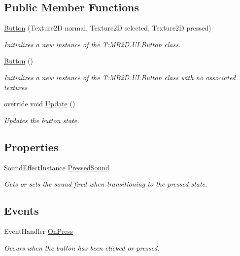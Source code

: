 \subsection*{Public Member Functions}
\begin{DoxyCompactItemize}
\item 
\hyperlink{class_m_b2_d_1_1_u_i_1_1_button_a30bf56105fa12c18ebffa1ba3e84cad9}{Button} (Texture2D normal, Texture2D selected, Texture2D pressed)
\begin{DoxyCompactList}\small\item\em Initializes a new instance of the T\+:\+M\+B2\+D.\+U\+I.\+Button class. \end{DoxyCompactList}\item 
\hyperlink{class_m_b2_d_1_1_u_i_1_1_button_a4d9a4339d2ebf59c059a493787790aa4}{Button} ()
\begin{DoxyCompactList}\small\item\em Initializes a new instance of the T\+:\+M\+B2\+D.\+U\+I.\+Button class with no associated textures \end{DoxyCompactList}\item 
override void \hyperlink{class_m_b2_d_1_1_u_i_1_1_button_a1686d24f172e05a1bf83fc3aa49cfab5}{Update} ()
\begin{DoxyCompactList}\small\item\em Updates the button state. \end{DoxyCompactList}\end{DoxyCompactItemize}
\subsection*{Properties}
\begin{DoxyCompactItemize}
\item 
Sound\+Effect\+Instance \hyperlink{class_m_b2_d_1_1_u_i_1_1_button_a92d0184df7962dd2aed3b8b0aa8c0d8e}{Pressed\+Sound}
\begin{DoxyCompactList}\small\item\em Gets or sets the sound fired when transitioning to the pressed state. \end{DoxyCompactList}\end{DoxyCompactItemize}
\subsection*{Events}
\begin{DoxyCompactItemize}
\item 
Event\+Handler \hyperlink{class_m_b2_d_1_1_u_i_1_1_button_a280d1c552f9e91c7e63811bc498a4f5e}{On\+Press}
\begin{DoxyCompactList}\small\item\em Occurs when the button has been clicked or pressed. \end{DoxyCompactList}\end{DoxyCompactItemize}
